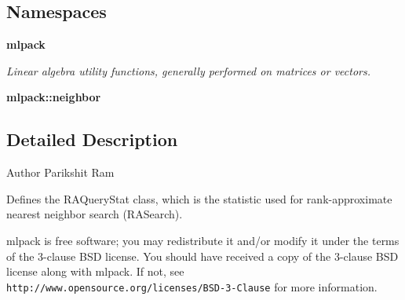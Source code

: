 \subsection*{Namespaces}
\begin{DoxyCompactItemize}
\item 
 \textbf{ mlpack}
\begin{DoxyCompactList}\small\item\em Linear algebra utility functions, generally performed on matrices or vectors. \end{DoxyCompactList}\item 
 \textbf{ mlpack\+::neighbor}
\end{DoxyCompactItemize}


\subsection{Detailed Description}
\begin{DoxyAuthor}{Author}
Parikshit Ram
\end{DoxyAuthor}
Defines the R\+A\+Query\+Stat class, which is the statistic used for rank-\/approximate nearest neighbor search (R\+A\+Search).

mlpack is free software; you may redistribute it and/or modify it under the terms of the 3-\/clause B\+SD license. You should have received a copy of the 3-\/clause B\+SD license along with mlpack. If not, see {\tt http\+://www.\+opensource.\+org/licenses/\+B\+S\+D-\/3-\/\+Clause} for more information. 